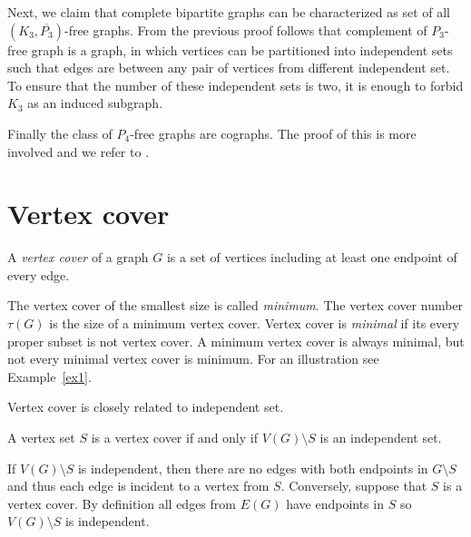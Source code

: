 Next, we claim that complete bipartite graphs can be characterized as set of all \((K_3, \overline{P_3})\)-free graphs.
From the previous proof follows that complement of \(P_3\)-free graph is a graph, in which vertices can be partitioned into independent sets
such that edges are between any pair of vertices from different independent set.
To ensure that the number of these independent sets is two, it is enough to forbid \(K_3\) as an induced subgraph.  

Finally the class of \(P_4\)-free graphs are cographs. The proof of this is more involved and we refer to \cite{Corneil81}.

\section{Vertex cover}
\begin{defn}
	A \emph{vertex cover} of a graph \(G\) is a set of vertices including at least one endpoint of every edge.
\end{defn}
The vertex cover of the smallest size is called \emph{minimum}. The vertex cover number \(\tau(G)\) is the size of a minimum vertex cover.
Vertex cover is \emph{minimal} if its every proper subset is not vertex cover.
A minimum vertex cover is always minimal, but not every minimal vertex cover is minimum. For an illustration see Example~\ref{ex1}.

Vertex cover is closely related to independent set.
\begin{obs}
	A vertex set \(S\) is a vertex cover if and only if \(V(G) \setminus S\) is an independent set.
\end{obs}
\begin{myproof}
	If \(V(G) \setminus S\) is independent, then there are no edges with both endpoints in \(G \setminus S\) 
	and thus each edge is incident to a vertex from \(S\).
	Conversely, suppose that \(S\) is a vertex cover. By definition all edges from \(E(G)\)
	have endpoints in \(S\) so \(V(G) \setminus S\) is independent.
\end{myproof}

